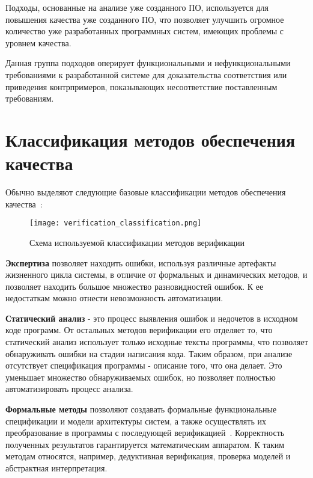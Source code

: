 Подходы, основанные на анализе уже созданного ПО, используется для повышения
качества уже созданного ПО, что позволяет улучшить огромное количество уже
разработанных программных систем, имеющих проблемы с уровнем качества.

Данная группа подходов оперирует функциональными и нефункциональными
требованиями к разработанной системе для доказательства соответствия или
приведения контрпримеров, показывающих несоответствие поставленным требованиям.

\section{Классификация методов обеспечения качества}

Обычно выделяют следующие базовые классификации методов обеспечения
качества~\cite{kulyamin}:

\begin{figure}[h!]
    \begin{center}
        \texttt{[image: verification\_classification.png]}
    \end{center}
    \caption{Схема используемой классификации методов верификации}
    \label{fig:verification_classification}
\end{figure}

\newpage

\textbf{Экспертиза} позволяет находить ошибки, используя различные артефакты
жизненного цикла системы, в отличие от формальных и динамических методов, и
позволяет находить большое множество разновидностей ошибок. К ее недостаткам
можно отнести невозможность автоматизации.

\textbf{Статический анализ} - это процесс выявления ошибок и недочетов в
исходном коде программ. От остальных методов верификации его отделяет то, что
статический анализ использует только исходные тексты программы, что позволяет
обнаруживать ошибки на стадии написания кода. Таким образом, при анализе
отсутствует спецификация программы - описание того, что она делает. Это
уменьшает множество обнаруживаемых ошибок, но позволяет полностью
автоматизировать процесс анализа.

\textbf{Формальные методы} позволяют создавать формальные функциональные
спецификации и модели архитектуры систем, а также осуществлять их преобразование
в программы с последующей верификацией~\cite{formal_methods}. Корректность
полученных результатов гарантируется математическим аппаратом. К таким методам
относятся, например, дедуктивная верификация, проверка моделей и абстрактная
интерпретация.

